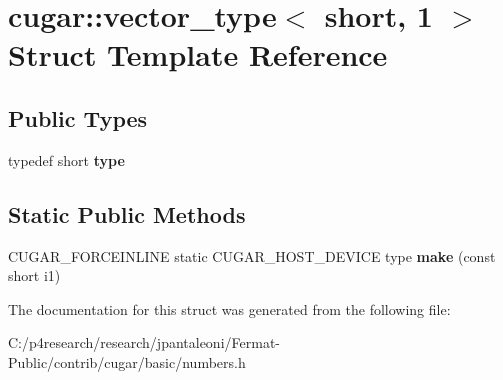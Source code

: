 \hypertarget{structcugar_1_1vector__type_3_01short_00_011_01_4}{}\section{cugar\+:\+:vector\+\_\+type$<$ short, 1 $>$ Struct Template Reference}
\label{structcugar_1_1vector__type_3_01short_00_011_01_4}
\subsection*{Public Types}
\begin{DoxyCompactItemize}
\item 
\mbox{\label{structcugar_1_1vector__type_3_01short_00_011_01_4_a3930a70d3197232a1a88603a895ff3d9}} 
typedef short {\bfseries type}
\end{DoxyCompactItemize}
\subsection*{Static Public Methods}
\begin{DoxyCompactItemize}
\item 
\mbox{\label{structcugar_1_1vector__type_3_01short_00_011_01_4_a253970ab8a1734a70c5d59e42511d96f}} 
C\+U\+G\+A\+R\+\_\+\+F\+O\+R\+C\+E\+I\+N\+L\+I\+NE static C\+U\+G\+A\+R\+\_\+\+H\+O\+S\+T\+\_\+\+D\+E\+V\+I\+CE type {\bfseries make} (const short i1)
\end{DoxyCompactItemize}


The documentation for this struct was generated from the following file\+:\begin{DoxyCompactItemize}
\item 
C\+:/p4research/research/jpantaleoni/\+Fermat-\/\+Public/contrib/cugar/basic/numbers.\+h\end{DoxyCompactItemize}
